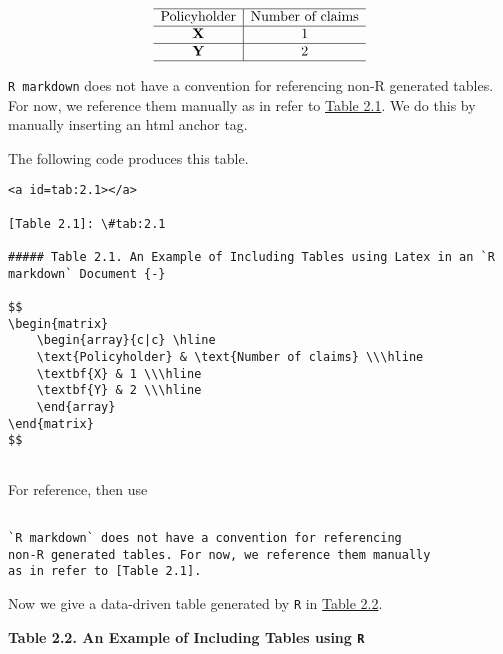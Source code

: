 \documentclass[
]{book}
\begin{document}
\[
\begin{matrix}
    \begin{array}{c|c} \hline
    \text{Policyholder} & \text{Number of claims} \\\hline
    \textbf{X} & 1 \\\hline
    \textbf{Y} & 2 \\\hline
    \end{array}
\end{matrix}
\]

\texttt{R\ markdown} does not have a convention for referencing non-R generated tables. For now, we reference them manually as in refer to \protect\hyperlink{tab:2.1}{Table 2.1}. We do this by manually inserting an html anchor tag.

The following code produces this table.

\begin{verbatim}
<a id=tab:2.1></a> 

[Table 2.1]: \#tab:2.1

##### Table 2.1. An Example of Including Tables using Latex in an `R markdown` Document {-}

$$
\begin{matrix}
    \begin{array}{c|c} \hline
    \text{Policyholder} & \text{Number of claims} \\\hline
    \textbf{X} & 1 \\\hline
    \textbf{Y} & 2 \\\hline
    \end{array}
\end{matrix}
$$
    
\end{verbatim}

For reference, then use

\begin{verbatim}

`R markdown` does not have a convention for referencing 
non-R generated tables. For now, we reference them manually 
as in refer to [Table 2.1].
\end{verbatim}

Now we give a data-driven table generated by \texttt{R} in \protect\hyperlink{tab:2.2}{Table 2.2}.

\textbf{Table 2.2. An Example of Including Tables using \texttt{R} }

\begin{table}[H]
\centering
{}
\end{table}
\end{document}
